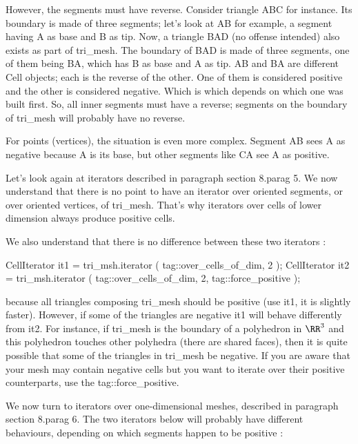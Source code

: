 However, the segments must have reverse.
Consider triangle {\codett ABC} for instance.
Its boundary is made of three segments; let's look at {\codett AB} for example,
a segment having {\codett A} as base and {\codett B} as tip.
Now, a triangle {\codett BAD} (no offense intended) also exists as part of {\codett tri\_mesh}.
The boundary of {\codett BAD} is made of three segments, one of them being {\codett BA},
which has {\codett B} as base and {\codett A} as tip.
{\codett AB} and {\codett BA} are different {\codett Cell} objects;
each is the reverse of the other.
One of them is considered positive and the other is considered negative.
Which is which depends on which one was built first.
So, all inner segments must have a reverse;
segments on the boundary of {\codett tri\_mesh} will probably have no reverse.

For points (vertices), the situation is even more complex.
Segment {\codett AB} sees {\codett A} as negative because {\codett A} is its base,
but other segments like {\codett CA} see {\codett A} as positive.

Let's look again at iterators described in paragraph \numb section 8.\numb parag 5.
We now understand that there is no point to have an iterator over oriented
segments, or over oriented vertices, of {\codett tri\_mesh}.
That's why iterators over cells of lower dimension always produce positive cells.

We also understand that there is no difference between these two iterators :

\verbatim
   CellIterator it1 = tri_msh.iterator ( tag::over_cells_of_dim, 2 );
   CellIterator it2 =
      tri_msh.iterator ( tag::over_cells_of_dim, 2, tag::force_positive );
\endverbatim

\noindent because all triangles composing {\codett tri\_mesh} should be positive
(use {\codett it1}, it is slightly faster).
However, if some of the triangles are negative {\codett it1} will behave differently from
{\codett it2}.
For instance, if {\codett tri\_mesh} is the boundary of a polyhedron in $ \RR^3 $
and this polyhedron touches other polyhedra (there are shared faces), then it is
quite possible that some of the triangles in {\codett tri\_mesh} be negative.
If you are aware that your mesh may contain negative cells but
you want to iterate over their positive counterparts, use the {\codett tag::force\_positive}.

We now turn to iterators over one-dimensional meshes, described in paragraph
\numb section 8.\numb parag 6.
The two iterators below will probably have different behaviours,
depending on which segments happen to be positive :

